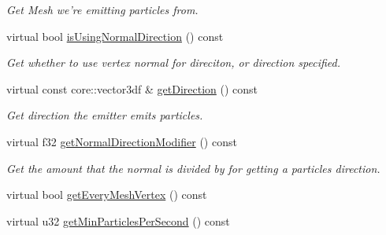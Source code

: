 \begin{DoxyCompactItemize}
\begin{DoxyCompactList}\small\item\em Get Mesh we're emitting particles from. \end{DoxyCompactList}\item 
\hypertarget{classirr_1_1scene_1_1_c_particle_animated_mesh_scene_node_emitter_af64402334958e7d3a8cfc7e4b1704c3b}{virtual bool \hyperlink{classirr_1_1scene_1_1_c_particle_animated_mesh_scene_node_emitter_af64402334958e7d3a8cfc7e4b1704c3b}{is\-Using\-Normal\-Direction} () const }\label{classirr_1_1scene_1_1_c_particle_animated_mesh_scene_node_emitter_af64402334958e7d3a8cfc7e4b1704c3b}

\begin{DoxyCompactList}\small\item\em Get whether to use vertex normal for direciton, or direction specified. \end{DoxyCompactList}\item 
\hypertarget{classirr_1_1scene_1_1_c_particle_animated_mesh_scene_node_emitter_ac70a60c4819bd6d6fb2c977c8ceb182a}{virtual const core\-::vector3df \& \hyperlink{classirr_1_1scene_1_1_c_particle_animated_mesh_scene_node_emitter_ac70a60c4819bd6d6fb2c977c8ceb182a}{get\-Direction} () const }\label{classirr_1_1scene_1_1_c_particle_animated_mesh_scene_node_emitter_ac70a60c4819bd6d6fb2c977c8ceb182a}

\begin{DoxyCompactList}\small\item\em Get direction the emitter emits particles. \end{DoxyCompactList}\item 
\hypertarget{classirr_1_1scene_1_1_c_particle_animated_mesh_scene_node_emitter_a2f3705f2a3e9dfef1dc2b1bd27a72028}{virtual f32 \hyperlink{classirr_1_1scene_1_1_c_particle_animated_mesh_scene_node_emitter_a2f3705f2a3e9dfef1dc2b1bd27a72028}{get\-Normal\-Direction\-Modifier} () const }\label{classirr_1_1scene_1_1_c_particle_animated_mesh_scene_node_emitter_a2f3705f2a3e9dfef1dc2b1bd27a72028}

\begin{DoxyCompactList}\small\item\em Get the amount that the normal is divided by for getting a particles direction. \end{DoxyCompactList}\item 
virtual bool \hyperlink{classirr_1_1scene_1_1_c_particle_animated_mesh_scene_node_emitter_a83beffee35deaa05c1a3654b9e0fc42b}{get\-Every\-Mesh\-Vertex} () const 
\item 
\hypertarget{classirr_1_1scene_1_1_c_particle_animated_mesh_scene_node_emitter_a5fbe62e7dec42e99bfffc6281b6e724a}{virtual u32 \hyperlink{classirr_1_1scene_1_1_c_particle_animated_mesh_scene_node_emitter_a5fbe62e7dec42e99bfffc6281b6e724a}{get\-Min\-Particles\-Per\-Second} () const }\label{classirr_1_1scene_1_1_c_particle_animated_mesh_scene_node_emitter_a5fbe62e7dec42e99bfffc6281b6e724a}


\end{DoxyCompactItemize}
